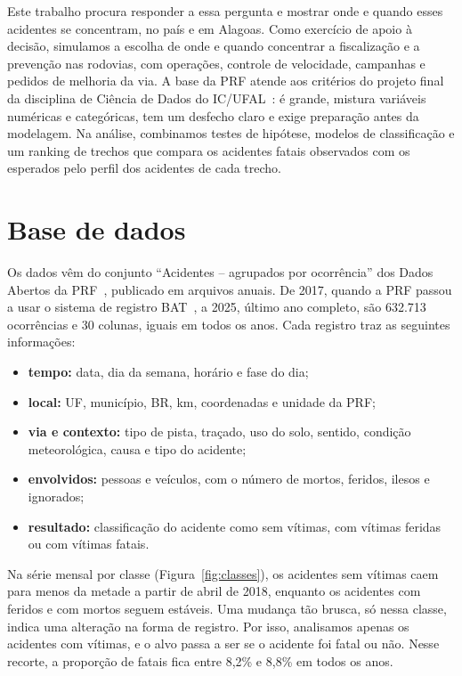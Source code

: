 \documentclass[12pt]{article}
\begin{document}
Este trabalho procura responder a essa pergunta e mostrar onde e quando esses acidentes se concentram, no país e em Alagoas. Como exercício de apoio à decisão, simulamos a escolha de onde e quando concentrar a fiscalização e a prevenção nas rodovias, com operações, controle de velocidade, campanhas e pedidos de melhoria da via. A base da PRF atende aos critérios do projeto final da disciplina de Ciência de Dados do IC/UFAL~\cite{disciplina}: é grande, mistura variáveis numéricas e categóricas, tem um desfecho claro e exige preparação antes da modelagem. Na análise, combinamos testes de hipótese, modelos de classificação e um ranking de trechos que compara os acidentes fatais observados com os esperados pelo perfil dos acidentes de cada trecho.

\section{Base de dados}

Os dados vêm do conjunto ``Acidentes -- agrupados por ocorrência'' dos Dados Abertos da PRF~\cite{prf}, publicado em arquivos anuais. De 2017, quando a PRF passou a usar o sistema de registro BAT~\cite{prfdicionario}, a 2025, último ano completo, são 632.713 ocorrências e 30 colunas, iguais em todos os anos. Cada registro traz as seguintes informações:
\begin{itemize}
  \item \textbf{tempo:} data, dia da semana, horário e fase do dia;
  \item \textbf{local:} UF, município, BR, km, coordenadas e unidade da PRF;
  \item \textbf{via e contexto:} tipo de pista, traçado, uso do solo, sentido, condição meteorológica, causa e tipo do acidente;
  \item \textbf{envolvidos:} pessoas e veículos, com o número de mortos, feridos, ilesos e ignorados;
  \item \textbf{resultado:} classificação do acidente como sem vítimas, com vítimas feridas ou com vítimas fatais.
\end{itemize}

Na série mensal por classe (Figura~\ref{fig:classes}), os acidentes sem vítimas caem para menos da metade a partir de abril de 2018, enquanto os acidentes com feridos e com mortos seguem estáveis. Uma mudança tão brusca, só nessa classe, indica uma alteração na forma de registro. Por isso, analisamos apenas os acidentes com vítimas, e o alvo passa a ser se o acidente foi fatal ou não. Nesse recorte, a proporção de fatais fica entre 8,2\% e 8,8\% em todos os anos.
\end{document}
